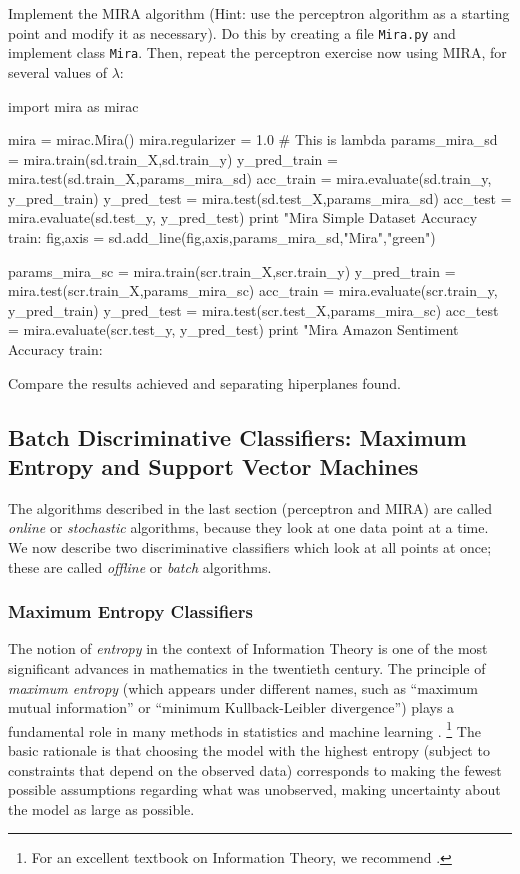 \begin{exercise}
Implement the MIRA algorithm (Hint: use the perceptron algorithm
  as a starting point and modify it as necessary). Do this by creating a 
  file {\tt Mira.py} and implement class {\tt Mira}. 
  Then, 
  repeat the perceptron exercise now using MIRA, for several values of $\lambda$: 
\begin{python}
import mira as mirac

mira = mirac.Mira()
mira.regularizer = 1.0 # This is lambda
params_mira_sd = mira.train(sd.train_X,sd.train_y)
y_pred_train = mira.test(sd.train_X,params_mira_sd)
acc_train = mira.evaluate(sd.train_y, y_pred_train)
y_pred_test = mira.test(sd.test_X,params_mira_sd)
acc_test = mira.evaluate(sd.test_y, y_pred_test)
print "Mira Simple Dataset Accuracy train: %
fig,axis = sd.add_line(fig,axis,params_mira_sd,"Mira","green")

params_mira_sc = mira.train(scr.train_X,scr.train_y)
y_pred_train = mira.test(scr.train_X,params_mira_sc)
acc_train = mira.evaluate(scr.train_y, y_pred_train)
y_pred_test = mira.test(scr.test_X,params_mira_sc)
acc_test = mira.evaluate(scr.test_y, y_pred_test)
print "Mira Amazon Sentiment Accuracy train: %
\end{python}
  
Compare the
results achieved and separating hiperplanes found.
\end{exercise}



\subsection{Batch Discriminative Classifiers: Maximum Entropy and Support Vector Machines}

The algorithms described in the last section (perceptron and MIRA) are called \emph{online} or \emph{stochastic} algorithms, because they look at one data point at a time. We now describe two discriminative classifiers which look at all points at once; these are called \emph{offline} or \emph{batch} algorithms.

\subsubsection{\label{s:me}Maximum Entropy Classifiers}

The notion of \emph{entropy} in the context of Information Theory \citep{Shannon1948} is one of the most significant advances 
in mathematics in the twentieth century. The principle of \emph{maximum entropy} (which appears under different names, 
such as ``maximum mutual information'' or  ``minimum Kullback-Leibler divergence'') plays a fundamental role 
in many methods in statistics and machine learning \citep{Jaynes1982}. \footnote{
For an excellent textbook on Information Theory, we recommend \citet{Cover1991}. }
The basic rationale is that choosing the model with the highest entropy (subject to 
constraints that depend on the observed data) corresponds to making the fewest possible assumptions regarding what was unobserved, making uncertainty 
about the model as large as possible.

